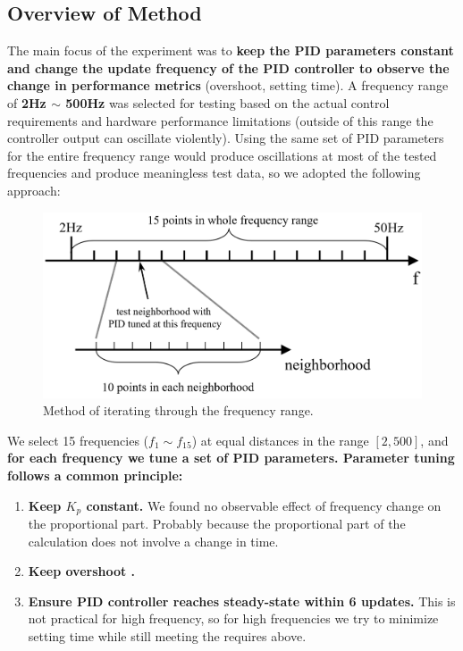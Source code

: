 \documentclass[conference]{IEEEtran}
\begin{document}
\subsection{Overview of Method}
The main focus of the experiment was to \textbf{keep the PID parameters constant and change the update frequency of the PID controller to observe the change in performance metrics} (overshoot, setting time). A frequency range of \textbf{2Hz $\sim$ 500Hz} was selected for testing based on the actual control requirements and hardware performance limitations (outside of this range the controller output can oscillate violently). Using the same set of PID parameters for the entire frequency range would produce oscillations at most of the tested frequencies and produce meaningless test data, so we adopted the following approach: 

\begin{figure}[htbp]
\centerline{\includegraphics[width=\linewidth]{Report/Pic/FrequencyRangeExplained.png}}
\caption{Method of iterating through the frequency range.}%
\label{fig_FrequencyRange}
\end{figure}

We select 15 frequencies ($f_{1}\sim f_{15}$) at equal distances in the range $[2,500]$,  and \textbf{for each frequency we tune a set of PID parameters. Parameter tuning follows a common principle:}
\begin{enumerate}
    \item\textbf{ Keep $K_{p}$ constant. }We found no observable effect of frequency change on the proportional part. Probably because the proportional part of the calculation does not involve a change in time.
    \item\textbf{ Keep overshoot . }
    \item\textbf{ Ensure PID controller reaches steady-state within 6 updates.} This is not practical for high frequency, so for high frequencies we try to minimize setting time  while still meeting the requires above. 
\end{enumerate}
\end{document}
